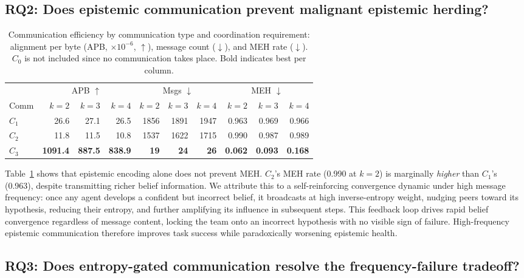 \documentclass[pdflatex,sn-mathphys-num]{sn-jnl}%
\theoremstyle{thmstyleone}%
\theoremstyle{thmstyletwo}%
\theoremstyle{thmstylethree}%
\begin{document}
\subsection{RQ2: Does epistemic communication prevent malignant epistemic herding?}
\label{rq2}
\begin{table}[t]
\caption{Communication efficiency by communication type and coordination requirement: alignment per byte (APB, $\times 10^{-6}$, $\uparrow$), message count ($\downarrow$), and MEH rate ($\downarrow$). $C_0$ is not included since no communication takes place. Bold indicates best per column.}
\label{tab:efficiency}
\begin{tabular}{lrrrrrrrrr}
\toprule
 & \multicolumn{3}{c}{APB $\uparrow$} & \multicolumn{3}{c}{Msgs $\downarrow$} & \multicolumn{3}{c}{MEH $\downarrow$} \\
\cmidrule(lr){2-4} \cmidrule(lr){5-7} \cmidrule(lr){8-10}
Comm & $k{=}2$ & $k{=}3$ & $k{=}4$ & $k{=}2$ & $k{=}3$ & $k{=}4$ & $k{=}2$ & $k{=}3$ & $k{=}4$ \\
\midrule
$C_1$ &    26.6 &    27.1 &    26.5 & 1856 & 1891 & 1947 & 0.963 & 0.969 & 0.966 \\
$C_2$ &    11.8 &    11.5 &    10.8 & 1537 & 1622 & 1715 & 0.990 & 0.987 & 0.989 \\
$C_3$ & \textbf{1091.4} & \textbf{887.5} & \textbf{838.9} & \textbf{19} & \textbf{24} & \textbf{26} & \textbf{0.062} & \textbf{0.093} & \textbf{0.168} \\
\bottomrule
\end{tabular}
\end{table}

Table~\ref{tab:efficiency} shows that epistemic encoding alone does not 
prevent MEH. $C_2$'s MEH rate (0.990 at $k{=}2$) 
is marginally \emph{higher} than $C_1$'s (0.963), despite transmitting 
richer belief information. We attribute this to a self-reinforcing 
convergence dynamic under high message frequency: once any agent develops 
a confident but incorrect belief, it broadcasts at high inverse-entropy 
weight, nudging peers toward its hypothesis, reducing their entropy, and 
further amplifying its influence in subsequent steps. This feedback loop 
drives rapid belief convergence regardless of message content, locking 
the team onto an incorrect hypothesis with no visible sign of failure. 
High-frequency epistemic communication therefore improves task success 
while paradoxically worsening epistemic health.

\subsection{RQ3: Does entropy-gated communication resolve the frequency-failure tradeoff?}
\end{document}
